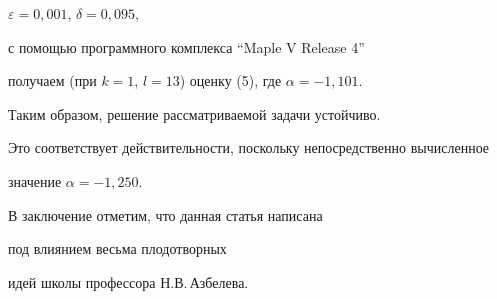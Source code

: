 ${\varepsilon}=0,001$, $\delta=0,095$,


с помощью программного комплекса ``Maple V Release 4''


получаем (при $k=1$, $l=13$) оценку (5), где $\alpha=-1,101$.


Таким образом, решение рассматриваемой задачи устойчиво.


Это соответствует действительности, поскольку непосредственно вычисленное


значение $\alpha=-1,250$.





В заключение отметим, что данная статья написана


под влиянием весьма плодотворных


идей школы профессора Н.В.\,Азбелева.





